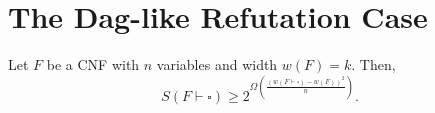 \section{The Dag-like Refutation Case}


\begin{tcolorbox}[colframe=white, colback=blue!4, boxrule=0mm, sharp corners]
\begin{theorem}
Let $F$ be a CNF with $n$ variables and width $w(F) = k$.
Then,  
$$
S(F \vdash \square) \geq 
    2^{
        \Omega
            \left(
                \frac{
                    \left(
                        w(F \vdash \square) - w(F)
                    \right)^2
                    }
                    {n}
            \right)}.
$$
\end{theorem}
\end{tcolorbox}
 

